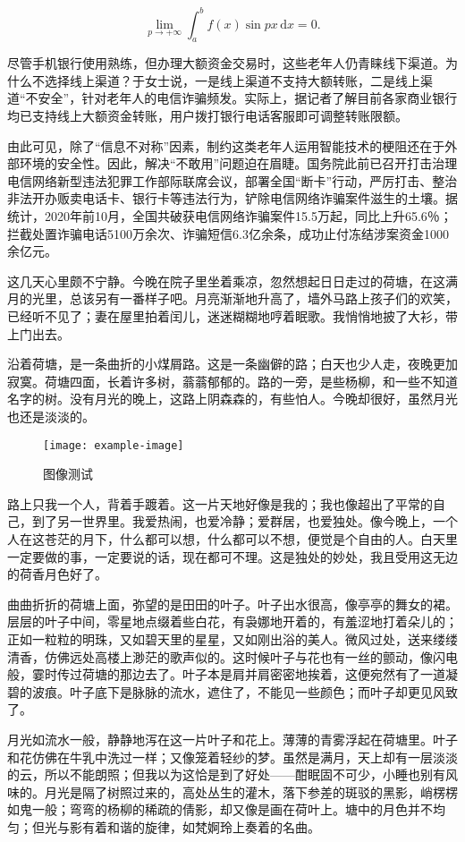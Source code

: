 \documentclass[printMode]{ecnuthesis}
\begin{document}
\[
  \lim_{p\to+\infty}\int_{a}^{b}f(x)\sin{px}\,\mathrm{d}x = 0.
\]

尽管手机银行使用熟练，但办理大额资金交易时，这些老年人仍青睐线下渠道。为什么不选择线上渠道？于女士说，一是线上渠道不支持大额转账，二是线上渠道“不安全”，针对老年人的电信诈骗频发。实际上，据记者了解目前各家商业银行均已支持线上大额资金转账，用户拨打银行电话客服即可调整转账限额。

由此可见，除了“信息不对称”因素，制约这类老年人运用智能技术的梗阻还在于外部环境的安全性。因此，解决“不敢用”问题迫在眉睫。国务院此前已召开打击治理电信网络新型违法犯罪工作部际联席会议，部署全国“断卡”行动，严厉打击、整治非法开办贩卖电话卡、银行卡等违法行为，铲除电信网络诈骗案件滋生的土壤。据统计，2020年前10月，全国共破获电信网络诈骗案件15.5万起，同比上升65.6％；拦截处置诈骗电话5100万余次、诈骗短信6.3亿余条，成功止付冻结涉案资金1000余亿元。

这几天心里颇不宁静。今晚在院子里坐着乘凉，忽然想起日日走过的荷塘，在这满月的光里，总该另有一番样子吧。月亮渐渐地升高了，墙外马路上孩子们的欢笑，已经听不见了；妻在屋里拍着闰儿，迷迷糊糊地哼着眠歌。我悄悄地披了大衫，带上门出去。

沿着荷塘，是一条曲折的小煤屑路。这是一条幽僻的路；白天也少人走，夜晚更加寂寞。荷塘四面，长着许多树，蓊蓊郁郁的。路的一旁，是些杨柳，和一些不知道名字的树。没有月光的晚上，这路上阴森森的，有些怕人。今晚却很好，虽然月光也还是淡淡的。

\begin{figure}
    \centering
    \texttt{[image: example-image]}
    \caption{图像测试}
\end{figure}

路上只我一个人，背着手踱着。这一片天地好像是我的；我也像超出了平常的自己，到了另一世界里。我爱热闹，也爱冷静；爱群居，也爱独处。像今晚上，一个人在这苍茫的月下，什么都可以想，什么都可以不想，便觉是个自由的人。白天里一定要做的事，一定要说的话，现在都可不理。这是独处的妙处，我且受用这无边的荷香月色好了。

曲曲折折的荷塘上面，弥望的是田田的叶子。叶子出水很高，像亭亭的舞女的裙。层层的叶子中间，零星地点缀着些白花，有袅娜地开着的，有羞涩地打着朵儿的；正如一粒粒的明珠，又如碧天里的星星，又如刚出浴的美人。微风过处，送来缕缕清香，仿佛远处高楼上渺茫的歌声似的。这时候叶子与花也有一丝的颤动，像闪电般，霎时传过荷塘的那边去了。叶子本是肩并肩密密地挨着，这便宛然有了一道凝碧的波痕。叶子底下是脉脉的流水，遮住了，不能见一些颜色；而叶子却更见风致了。

月光如流水一般，静静地泻在这一片叶子和花上。薄薄的青雾浮起在荷塘里。叶子和花仿佛在牛乳中洗过一样；又像笼着轻纱的梦。虽然是满月，天上却有一层淡淡的云，所以不能朗照；但我以为这恰是到了好处——酣眠固不可少，小睡也别有风味的。月光是隔了树照过来的，高处丛生的灌木，落下参差的斑驳的黑影，峭楞楞如鬼一般；弯弯的杨柳的稀疏的倩影，却又像是画在荷叶上。塘中的月色并不均匀；但光与影有着和谐的旋律，如梵婀玲上奏着的名曲。
\end{document}
